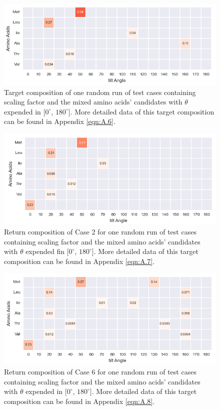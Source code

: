 \begin{figure}[!ht] 
\centering
\includegraphics[scale=0.7]{Figures/chapter6_figure_five.png}
\caption{Target composition of one random run of test cases containing scaling factor and the mixed amino acids' candidates with $\theta$ expended in $[0^{\circ}$, $180^{\circ}]$. More detailed data of this target composition can be found in Appendix \ref{eqn:A.6}.} \label{fig:6.4}
\end{figure}

\begin{figure}[!ht] 
\centering
\includegraphics[scale=0.7]{Figures/chapter6_figure_three.png}
\caption{Return composition of Case 2 for one random run of test cases containing scaling factor and the mixed amino acids' candidates with $\theta$ expended fin $[0^{\circ}$, $180^{\circ}]$. More detailed data of this target composition can be found in Appendix \ref{eqn:A.7}.} \label{fig:6.5}
\end{figure}

\begin{figure}[!ht] 
\centering
\includegraphics[scale=0.7]{Figures/chapter6_figure_four.png}
\caption{Return composition of Case 6 for one random run of test cases containing scaling factor and the mixed amino acids' candidates with $\theta$ expended in $[0^{\circ}$, $180^{\circ}]$. More detailed data of this target composition can be found in Appendix \ref{eqn:A.8}.} \label{fig:6.6}
\end{figure}

